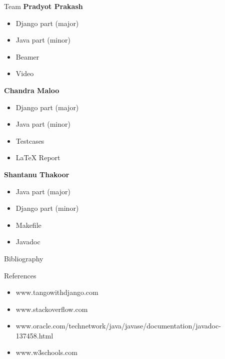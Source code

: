 \documentclass{beamer}
\begin{document}
\begin{frame}[t]{Team}
\textbf{Pradyot Prakash}\\
\pause
\begin{itemize}[<+->]
\item Django part (major)
\item Java part (minor)
\item Beamer
\item Video
\end{itemize}
  \pause
\textbf{Chandra Maloo}\\
\pause
\begin{itemize}[<+->]
\item Django part (major)
\item Java part (minor)
\item Testcases
\item LaTeX Report
\end{itemize}
\pause
\textbf{Shantanu Thakoor}\\
\pause
\begin{itemize}[<+->]
\item Java part (major)
\item Django part (minor)
\item Makefile
\item Javadoc
\end{itemize}
\pause
\end{frame}

\begin{frame}[t]{Bibliography}{}
     \vspace{10mm}
 \begin{beamerboxesrounded}[lower=blockstext,upper=blockstitle]{References}
    \pause
    \begin{itemize}[<+->]
    \item www.tangowithdjango.com
    \item www.stackoverflow.com
    \item www.oracle.com/technetwork/java/javase/documentation/javadoc-137458.html
    \item www.w3schools.com
 \end{itemize}
      \pause
      {}

  \end{beamerboxesrounded}
\end{frame}
\end{document}
